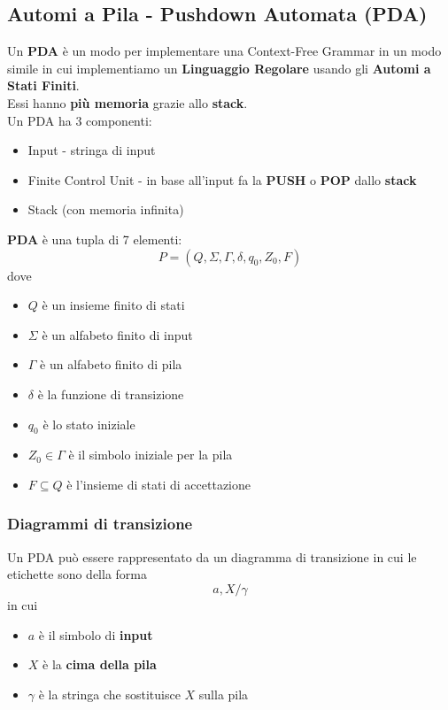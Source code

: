 \documentclass[12pt]{article}
\begin{document}
\subsection{Automi a Pila - Pushdown Automata (PDA)}
Un \textbf{PDA} è un modo per implementare una Context-Free Grammar in un modo simile in cui implementiamo un \textbf{Linguaggio Regolare} usando gli \textbf{Automi a Stati Finiti}.\\
Essi hanno \textbf{più memoria} grazie allo \textbf{stack}.\\
Un PDA ha 3 componenti:
\begin{itemize}
    \item Input - stringa di input
    \item Finite Control Unit - in base all'input fa la \textbf{PUSH} o \textbf{POP} dallo \textbf{stack}
    \item Stack (con memoria infinita)
\end{itemize}
\textbf{PDA} è una tupla di 7 elementi:
\begin{equation*}
    P=(Q,\Sigma,\Gamma,\delta,q_0,Z_0,F)
\end{equation*}
dove
\begin{itemize}
    \item $Q$ è un insieme finito di stati
    \item $\Sigma$ è un alfabeto finito di input
    \item $\Gamma$ è un alfabeto finito di pila
    \item $\delta$ è la funzione di transizione
    \item $q_0$ è lo stato iniziale
    \item $Z_0 \in \Gamma$ è il simbolo iniziale per la pila
    \item $F \subseteq Q$ è l'insieme di stati di accettazione  
\end{itemize}

\subsubsection{Diagrammi di transizione}
Un PDA può essere rappresentato da un diagramma di transizione in cui le etichette
sono della forma
\begin{equation*}
    a,X/\gamma
\end{equation*}
in cui
\begin{itemize}
    \item $a$ è il simbolo di \textbf{input}
    \item $X$ è la \textbf{cima della pila}
    \item $\gamma$ è la stringa che sostituisce $X$ sulla pila
\end{itemize}
\end{document}

